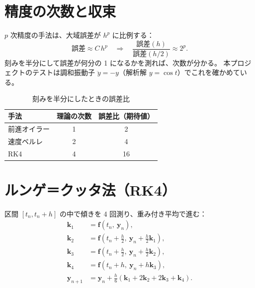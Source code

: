 \section{精度の次数と収束}\label{sec:order}

$p$ 次精度の手法は、大域誤差が $h^p$ に比例する：
\begin{equation}
  \text{誤差}\approx C\,h^p
  \quad\Longrightarrow\quad
  \frac{\text{誤差}(h)}{\text{誤差}(h/2)}\approx 2^p.
\end{equation}
刻みを半分にして誤差が何分の 1 になるかを測れば、次数が分かる。
本プロジェクトのテストは調和振動子 $\ddot y=-y$（解析解 $y=\cos t$）でこれを確かめている。

\begin{table}[htbp]
\centering
\caption{刻みを半分にしたときの誤差比}\label{tab:order}
\begin{tabular}{lcc}
\toprule
手法 & 理論の次数 & 誤差比（期待値） \\
\midrule
前進オイラー & 1 & 2 \\
速度ベルレ   & 2 & 4 \\
RK4          & 4 & 16 \\
\bottomrule
\end{tabular}
\end{table}

\section{ルンゲ＝クッタ法（RK4）}\label{sec:rk4}

区間 $[t_n,t_n+h]$ の中で傾きを 4 回測り、重み付き平均で進む：
\begin{equation}
\begin{aligned}
  \mathbf k_1&=\mathbf f(t_n,\ \mathbf y_n),\\
  \mathbf k_2&=\mathbf f\!\left(t_n+\tfrac h2,\ \mathbf y_n+\tfrac h2\mathbf k_1\right),\\
  \mathbf k_3&=\mathbf f\!\left(t_n+\tfrac h2,\ \mathbf y_n+\tfrac h2\mathbf k_2\right),\\
  \mathbf k_4&=\mathbf f\!\left(t_n+h,\ \mathbf y_n+h\mathbf k_3\right),\\
  \mathbf y_{n+1}&=\mathbf y_n+\tfrac h6\left(\mathbf k_1+2\mathbf k_2+2\mathbf k_3+\mathbf k_4\right).
\end{aligned}
\label{eq:rk4}
\end{equation}

